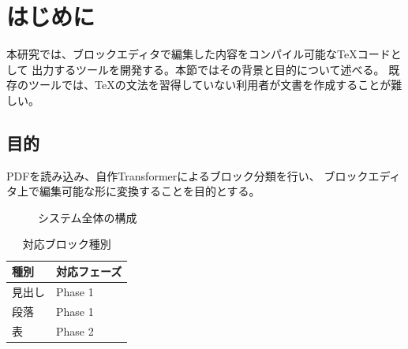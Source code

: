 \documentclass[uplatex,dvipdfmx]{jsarticle}
\begin{document}
\section{\color{labelheading}はじめに}

本研究では、ブロックエディタで編集した内容をコンパイル可能なTeXコードとして
出力するツールを開発する。本節ではその背景と目的について述べる。
既存のツールでは、TeXの文法を習得していない利用者が文書を作成することが難しい。

\subsection{\color{labelheading}目的}

PDFを読み込み、自作Transformerによるブロック分類を行い、
ブロックエディタ上で編集可能な形に変換することを目的とする。

\begin{figure}[h]
\centering
\fbox{\rule{0pt}{3cm}\rule{5cm}{0pt}}
\caption{\color{labelcaption}システム全体の構成}
\end{figure}

\begin{table}[h]
\centering
\caption{\color{labelcaption}対応ブロック種別}
\begin{tabular}{|l|l|}
\hline
種別 & 対応フェーズ \\
\hline
見出し & Phase 1 \\
段落 & Phase 1 \\
表 & Phase 2 \\
\hline
\end{tabular}
\end{table}
\end{document}
